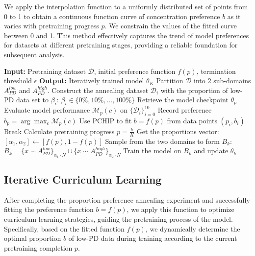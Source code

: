 \documentclass[11pt]{article}
\begin{document}
We apply the interpolation function to a uniformly distributed set of points from 0 to 1 to obtain a continuous function curve of concentration preference \( b \) as it varies with pretraining progress \( p \). We constrain the values of the fitted curve between 0 and 1. This method effectively captures the trend of model preferences for datasets at different pretraining stages, providing a reliable foundation for subsequent analysis.

\begin{algorithm}[t] 
\caption{\small Iterative Optimization of Preference Functions}
\small
\begin{algorithmic}[1]
\State \textbf{Input:} Pretraining dataset $\mathcal{D}$, initial preference function $f(p)$, termination threshold $\epsilon$
\State \textbf{Output:} Iteratively trained model \(\theta_K\)
    \State Partition \( \mathcal{D} \) into \( 2 \) sub-domains \( A_{PD}^{low} \) and $A_{PD}^{high}$. 
    \State Construct the annealing dataset \(\mathcal{D}_i\) with the proportion of low-PD data set to \(\beta_i\): 
    \State $\beta_i \in \{0\%, 10\%, \ldots, 100\%\}$
        \State Retrieve the model checkpoint \(\theta_p\)
        \State Evaluate model performance $\mathcal{M}_p(c)$ on \(\{\mathcal{D}_i\}_{i=0}^{10}\)
        \State Record preference $b_p = \arg\max_{c} \mathcal{M}_p(c)$
    \EndFor
    \State Use PCHIP to fit $b = f(p)$ from data points $(p_i, b_i)$
        \State Break
    \EndIf
    \State Calculate pretraining progress  $p = \frac{k}{K}$
    \State Get the proportions vector: 
    \State $[\alpha_{1}, \alpha_{2}] \gets [f(p), 1-f(p)]$
    \State Sample from the two domains to form $B_{k}$:
    \State $B_{k} = \{ x \sim A_{PD}^{low}\}_{\alpha_{1} \cdot N} \cup \{ x \sim A_{PD}^{high}\}_{\alpha_{2} \cdot N}$
    \State Train the model on \( B_k \) and update \(\theta_k\)
    \EndFor
    
\EndWhile
\end{algorithmic}
\label{alg:2}
\end{algorithm}

\subsection{Iterative Curriculum Learning}
After completing the proportion preference annealing experiment and successfully fitting the preference function \( b = f(p) \), we apply this function to optimize curriculum learning strategies, guiding the pretraining process of the model. Specifically, based on the fitted function \( f(p) \), we dynamically determine the optimal proportion \( b \) of low-PD data during training according to the current pretraining completion \( p \). 
\end{document}
